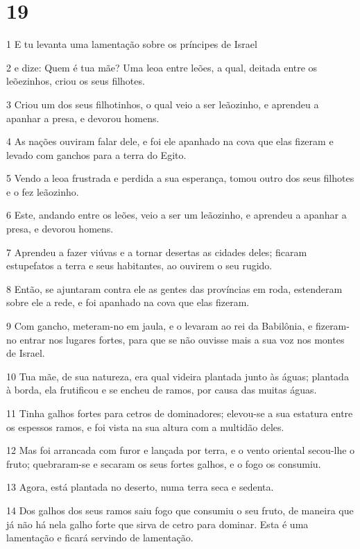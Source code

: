 \chapter{19}

\par 1 E tu levanta uma lamentação sobre os príncipes de Israel
\par 2 e dize: Quem é tua mãe? Uma leoa entre leões, a qual, deitada entre os leõezinhos, criou os seus filhotes.
\par 3 Criou um dos seus filhotinhos, o qual veio a ser leãozinho, e aprendeu a apanhar a presa, e devorou homens.
\par 4 As nações ouviram falar dele, e foi ele apanhado na cova que elas fizeram e levado com ganchos para a terra do Egito.
\par 5 Vendo a leoa frustrada e perdida a sua esperança, tomou outro dos seus filhotes e o fez leãozinho.
\par 6 Este, andando entre os leões, veio a ser um leãozinho, e aprendeu a apanhar a presa, e devorou homens.
\par 7 Aprendeu a fazer viúvas e a tornar desertas as cidades deles; ficaram estupefatos a terra e seus habitantes, ao ouvirem o seu rugido.
\par 8 Então, se ajuntaram contra ele as gentes das províncias em roda, estenderam sobre ele a rede, e foi apanhado na cova que elas fizeram.
\par 9 Com gancho, meteram-no em jaula, e o levaram ao rei da Babilônia, e fizeram-no entrar nos lugares fortes, para que se não ouvisse mais a sua voz nos montes de Israel.
\par 10 Tua mãe, de sua natureza, era qual videira plantada junto às águas; plantada à borda, ela frutificou e se encheu de ramos, por causa das muitas águas.
\par 11 Tinha galhos fortes para cetros de dominadores; elevou-se a sua estatura entre os espessos ramos, e foi vista na sua altura com a multidão deles.
\par 12 Mas foi arrancada com furor e lançada por terra, e o vento oriental secou-lhe o fruto; quebraram-se e secaram os seus fortes galhos, e o fogo os consumiu.
\par 13 Agora, está plantada no deserto, numa terra seca e sedenta.
\par 14 Dos galhos dos seus ramos saiu fogo que consumiu o seu fruto, de maneira que já não há nela galho forte que sirva de cetro para dominar. Esta é uma lamentação e ficará servindo de lamentação.


